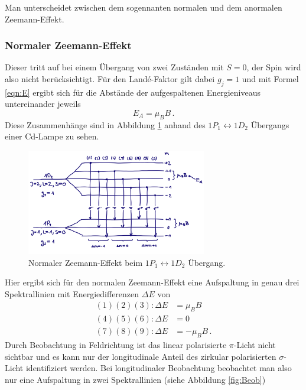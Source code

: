         Man unterscheidet zwischen dem sogennanten normalen und dem anormalen Zeemann-Effekt.
        \subsubsection{Normaler Zeemann-Effekt}
            Dieser tritt auf bei einem Übergang von zwei Zuständen mit $S=0$, der Spin wird also nicht berücksichtigt.
            Für den Landé-Faktor gilt dabei $g_j=1$ und mit Formel \ref{eqn:E}
            ergibt sich für die Abstände der aufgespaltenen Energieniveaus untereinander jeweils
            \begin{equation}
                E_A= \mu_BB \, .
            \end{equation}
            Diese Zusammenhänge sind in Abbildung \ref{fig:NZ} anhand des $1P_1\leftrightarrow 1D_2$ Übergangs einer Cd-Lampe zu sehen.
            \begin{figure}[h]
                \centering
                \includegraphics[width = 0.7\textwidth]{pictures/normal.png}
                \caption{Normaler Zeemann-Effekt beim $1P_1\leftrightarrow 1D_2$ Übergang.}
                \label{fig:NZ}
            \end{figure}
            Hier ergibt sich für den normalen Zeemann-Effekt eine Aufspaltung in genau drei Spektrallinien
            mit Energiedifferenzen $\Delta E$ von
            \begin{align}
                (1)(2)(3): \Delta E&=\mu_BB \\
                (4)(5)(6): \Delta E&=0 \\
                (7)(8)(9): \Delta E&=-\mu_BB \, .
            \end{align}
            Durch Beobachtung in Feldrichtung ist das linear polarisierte $\pi$-Licht nicht sichtbar und es
            kann nur der longitudinale Anteil des zirkular polarisierten $\sigma$-Licht identifiziert werden.
            Bei longitudinaler Beobachtung beobachtet man also nur eine Aufspaltung in zwei Spektrallinien (siehe Abbildung \ref{fig:Beob})
